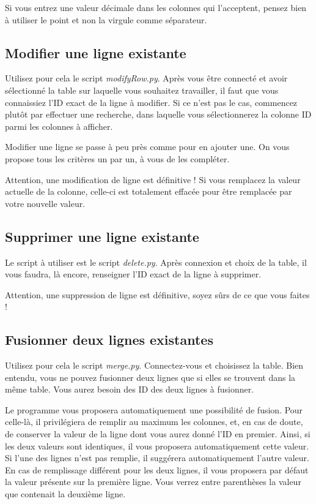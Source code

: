 \documentclass[12pt,a4paper]{article}
\begin{document}
    Si vous entrez une valeur décimale dans les colonnes qui l'acceptent, pensez bien à utiliser le point et non la
    virgule comme séparateur.


\bigskip
\subsection{Modifier une ligne existante}
    
    Utilisez pour cela le script \emph{modifyRow.py}.
    Après vous être connecté et avoir sélectionné la table sur laquelle vous souhaitez travailler,
    il faut que vous connaissiez l'ID exact de la ligne à modifier. Si ce n'est pas le cas,
    commencez plutôt par effectuer une recherche, dans laquelle vous sélectionnerez la colonne ID
    parmi les colonnes à afficher.

    Modifier une ligne se passe à peu près comme pour en ajouter une. On vous propose tous les critères
    un par un, à vous de les compléter.

    Attention, une modification de ligne est définitive ! Si vous remplacez la valeur actuelle de la colonne,
    celle-ci est totalement effacée pour être remplacée par votre nouvelle valeur.


\bigskip
\subsection{Supprimer une ligne existante}

    Le script à utiliser est le script \emph{delete.py}.
    Après connexion et choix de la table, il vous faudra, là encore, renseigner l'ID exact de la ligne
    à supprimer.
    
    Attention, une suppression de ligne est définitive, soyez sûrs de ce que vous faites !


\bigskip
\subsection{Fusionner deux lignes existantes}

    Utilisez pour cela le script \emph{merge.py}.
    Connectez-vous et choisissez la table. Bien entendu, vous ne pouvez fusionner deux lignes
    que si elles se trouvent dans la même table. Vous aurez besoin des ID des deux lignes à fusionner.
    
    Le programme vous proposera automatiquement une possibilité de fusion. Pour celle-là, il privilégiera
    de remplir au maximum les colonnes, et, en cas de doute, de conserver la valeur de la ligne dont vous
    aurez donné l'ID en premier.
    Ainsi, si les deux valeurs sont identiques, il vous proposera automatiquement cette valeur. Si l'une
    des lignes n'est pas remplie, il suggérera automatiquement l'autre valeur. En cas de remplissage différent
    pour les deux lignes, il vous proposera par défaut la valeur présente sur la première ligne. Vous verrez
    entre parenthèses la valeur que contenait la deuxième ligne.
\end{document}
